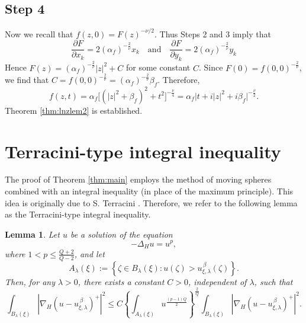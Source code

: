 \documentclass[reqno]{amsart}
\newtheorem{lem}[thm]{Lemma}
\theoremstyle{definition}
\theoremstyle{remark}
\numberwithin{equation}{section}
\begin{document}
\subsection*{Step 4}

Now we recall that $f(z,0)=F(z)^{-\nu/2}$. Thus Steps 2 and 3 imply that
\[
\frac {\partial F}{\partial x_k} = 2 (\alpha_f)^{-\frac {2}{\nu}} x_k \quad \text{and} \quad 
\frac {\partial F}{\partial y_k} = 2 (\alpha_f)^{-\frac {2}{\nu}} y_k
\] 
Hence $F(z)=(\alpha_f)^{-\frac {2}{\nu}} |z|^2 + C$ for some constant $C$. Since $F(0)=f(0,0)^{-\frac {2}{\nu}}$,
we find that $C=f(0,0)^{-\frac {2}{\nu}} = (\alpha_f)^{-\frac {2}{\nu}} \beta_f$. Therefore,
\[
f(z,t) = \alpha_f \Big[(|z|^2 + \beta_f)^2 + t^2\Big]^{-\frac {\nu}{4}}
= \alpha_f \big|t + i|z|^2 + i \beta_f \big|^{-\frac {\nu}{2}}.
\]
Theorem \ref{thm:lnzlem2} is established.

\section{Terracini-type integral inequality}
\label{sec:Terracini}

The proof of Theorem \ref{thm:main} employs the method of moving spheres combined with an integral inequality
(in place of the maximum principle). This idea is originally due to S. Terracini \cite{Terracini95, Terracini96}.
Therefore, we refer to the following lemma as the Terracini-type integral inequality.

\begin{lem}\label{lem:terracini}
Let $u$ be a solution of the equation
\begin{equation*}
-\Delta_{\! H} u = u^{p},
\end{equation*}
where $1<p\leq \frac {Q+2}{Q-2}$, and let
\[
A_{\lambda}(\xi) := \left\{ \zeta \in B_{\lambda}(\xi) : u(\zeta) > u_{\xi,\lambda}^{\,\beta}(\zeta) \right\}.
\]
Then, for any $\lambda > 0$, there exists a constant $C > 0$, independent of $\lambda$, such that
\begin{equation}\label{eqn:terracini}
\int_{B_{\lambda}(\xi)} 
\left|\nabla_{\! H} (u - u_{\xi,\lambda}^{\,\beta})^{+}\right|^2 
\leq C \left\{ \int_{A_{\lambda}(\xi)} u^{\frac{(p-1)Q}{2}} \right\}^{\frac{2}{Q}} 
\int_{B_{\lambda}(\xi)} \left|\nabla_{\! H} (u - u_{\xi,\lambda}^{\,\beta})^{+}\right|^2.
\end{equation}
\end{lem}
\end{document}
